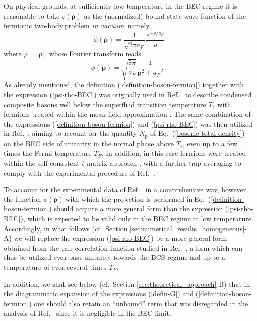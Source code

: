 \documentclass[pra,twocolumn,aps,amssymb,showpacs,superscriptaddress]{revtex4-1}
\begin{document}
On physical grounds, at sufficiently low temperature in the BEC regime it is reasonable to take $\phi(\boldsymbol{\rho})$ as the (normalized) bound-state wave function of the fermionic two-body problem
\emph{in vacuum}, namely,
\begin{equation}
\phi(\boldsymbol{\rho}) = \frac{1}{\sqrt{2 \pi a_{F}}}  \frac{e^{-\rho/a_{F}}}{\rho}
\label{psi-rho-BEC}
\end{equation}
where $\rho = |\boldsymbol{\rho}|$, whose Fourier transform reads
\begin{equation}
\phi({\mathbf p})  =  \sqrt{\frac{8 \pi}{a_{F}}} \frac{1}{{\mathbf p}^{2}  +  a_{F}^{-2}}  \, .
\label{psi-k-BEC}
\end{equation}
As already mentioned, the definition (\ref{definition-boson-fermion}) together with the expression (\ref{psi-rho-BEC}) was originally used in Ref.~\cite{Andrenacci-2003} to describe condensed composite bosons well below the superfluid transition temperature $T_{c}$ with fermions treated within the mean-field approximation \cite{BCS-1957}.
The same combination of the expressions (\ref{definition-boson-fermion}) and (\ref{psi-rho-BEC}) was then utilized in Ref.~\cite{Ulm-Cam-2019}, aiming to account for the quantity $N_{\mathrm{p}}$ 
of Eq.~(\ref{bosonic-total-density}) on the BEC side of unitarity in the normal phase above $T_{c}$, even up to a few times the Fermi temperature $T_{F}$.
In addition, in this case fermions were treated within the self-consistent $t$-matrix approach \cite{PPS-2019}, with a further trap averaging to comply with the experimental procedure of 
Ref.~\cite{Ulm-Cam-2019}.

To account for the experimental data of Ref.~\cite{Ulm-Cam-2019} in a comprehensive way, however, the function $\phi(\boldsymbol{\rho})$ with which the projection is performed
in Eq.~(\ref{definition-boson-fermion}) should acquire a more general form than the expression (\ref{psi-rho-BEC}), which is expected to be valid only in the BEC regime at low temperature.
Accordingly, in what follows (cf.~Section \ref{sec:numerical_results_homogeneous}-A) we will replace the expression (\ref{psi-rho-BEC}) by a more general form obtained from the pair correlation function studied in Ref.~\cite{Palestini-2014}, a form which can thus be utilized even past unitarity towards the BCS regime and up to a temperature of even several times $T_{F}$.

In addition, we shall see below 
(cf.~Section \ref{sec:theoretical_approach}-B) that in the diagrammatic expansion of the expressions (\ref{defin-G}) and (\ref{definition-boson-fermion}) one should also retain an ``unbound'' term that was disregarded in the analysis of Ref.~\cite{Ulm-Cam-2019} since it is negligible in the BEC limit.
\end{document}

